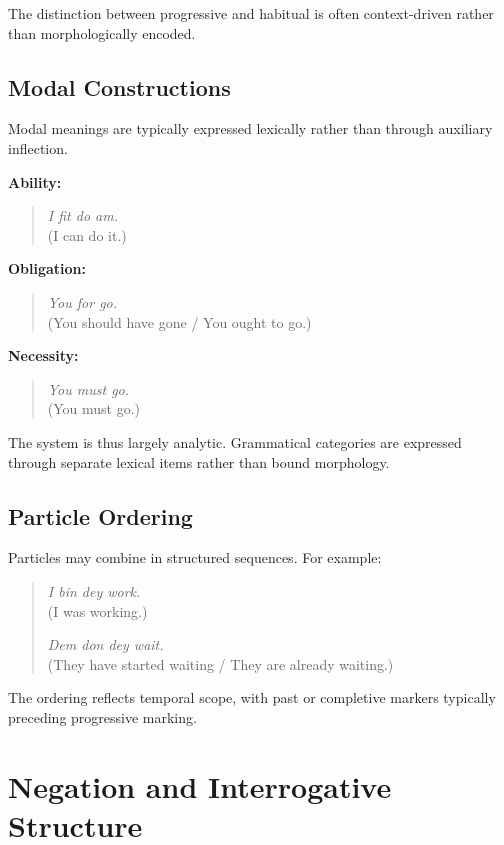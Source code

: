 \documentclass[12pt]{article}
\begin{document}
The distinction between progressive and habitual is often context-driven rather than morphologically encoded.

\subsection{Modal Constructions}

Modal meanings are typically expressed lexically rather than through auxiliary inflection.

\textbf{Ability:}

\begin{quote}
\textit{I fit do am.} \\
(I can do it.)
\end{quote}

\textbf{Obligation:}

\begin{quote}
\textit{You for go.} \\
(You should have gone / You ought to go.)
\end{quote}

\textbf{Necessity:}

\begin{quote}
\textit{You must go.} \\
(You must go.)
\end{quote}

The system is thus largely analytic. Grammatical categories are expressed through separate lexical items rather than bound morphology.

\subsection{Particle Ordering}

Particles may combine in structured sequences. For example:

\begin{quote}
\textit{I bin dey work.} \\
(I was working.)

\textit{Dem don dey wait.} \\
(They have started waiting / They are already waiting.)
\end{quote}

The ordering reflects temporal scope, with past or completive markers typically preceding progressive marking.

\section{Negation and Interrogative Structure}
\end{document}
